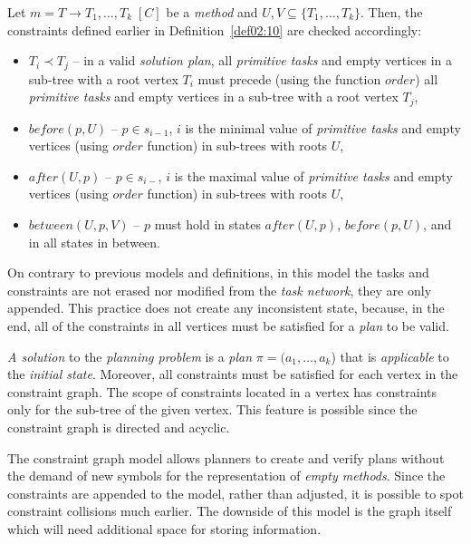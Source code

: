 \medskip\noindent
Let $m = T \rightarrow T_1, \dots, T_k \; [C]$ be a \emph{method} and $U,V \subseteq \{ T_1, \dots, T_k \}$. Then, the constraints defined earlier in Definition~\ref{def02:10} are checked accordingly:

\begin{itemize}
    \item $T_i \prec T_j$ – in a valid \emph{solution plan}, all \emph{primitive tasks} and empty vertices in a sub-tree with a root vertex $T_i$ must precede (using the function $order$) all \emph{primitive tasks} and empty vertices in a sub-tree with a root vertex $T_j$,

    \item $before(p, U)$ – $p \in s_{i-1}$, $i$ is the minimal value of \emph{primitive tasks} and empty vertices (using $order$ function) in sub-trees with roots $U$,

    \item $after(U, p)$ – $p \in s_{i-}$, $i$ is the maximal value of \emph{primitive tasks} and empty vertices (using $order$ function) in sub-trees with roots $U$,

    \item $between(U, p, V)$ – $p$ must hold in states $after(U, p)$, $before(p, U)$, and in all states in between.
\end{itemize}

\medskip\noindent
On contrary to previous models and definitions, in this model the tasks and constraints are not erased nor modified from the \emph{task network}, they are only appended. This practice does not create any inconsistent state, because, in the end, all of the constraints in all vertices must be satisfied for a \emph{plan} to be valid. 

\medskip\noindent
\emph{A solution} to the \emph{planning problem} is a \emph{plan} $\pi = (a_1, \dots, a_k$) that is \emph{applicable} to the \emph{initial state}. Moreover, all constraints must be satisfied for each vertex in the constraint graph. The scope of constraints located in a vertex has constraints only for the sub-tree of the given vertex. This feature is possible since the constraint graph is directed and acyclic.

\medskip\noindent
The constraint graph model allows planners to create and verify plans without the demand of new symbols for the representation of \emph{empty methods}. Since the constraints are appended to the model, rather than adjusted, it is possible to spot constraint collisions much earlier. The downside of this model is the graph itself which will need additional space for storing information.

